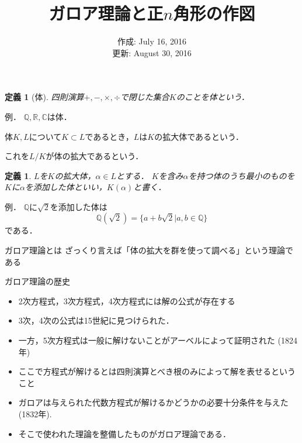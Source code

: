 \documentclass[dvipdfmx,17pt]{beamer}
\title{ガロア理論と正$n$角形の作図}
\date{作成: July 16, 2016 \\ 更新: August 30, 2016 }
\theoremstyle{plain}
\newtheorem{defi}[thm]{定義}
\newcommand{\Q}{\mathbb{Q}}
\newcommand{\R}{\mathbb{R}}
\newcommand{\C}{\mathbb{C}}
\begin{document}
\begin{frame}\frametitle{}
\titlepage
\end{frame}

\begin{frame}
\begin{defi}[体]
四則演算$+, -, \times, \div$で閉じた集合$K$のことを体という．
\end{defi}
\end{frame}

\begin{frame}
例． $\Q, \R, \C$は体．
\end{frame}

\begin{frame}
体$K, L$について$K \subset L$であるとき，$L$は$K$の拡大体であるという．

これを$L/K$が体の拡大であるという．
\end{frame}

\begin{frame}
\begin{defi}
$L$を$K$の拡大体，$\alpha \in L$とする．
$K$を含み$\alpha$を持つ体のうち最小のものを$K$に$\alpha$を添加した体といい，$K(\alpha)$と書く．
\end{defi}
\end{frame}

\begin{frame}
例． $\Q$に$\sqrt{2}$を添加した体は
\[\Q(\sqrt{2}) = \{a+b\sqrt{2} | a, b \in \Q \} \]
である．
\end{frame}

\begin{frame}{ガロア理論とは}
ざっくり言えば「体の拡大を群を使って調べる」という理論である
\end{frame}

\begin{frame}{ガロア理論の歴史}
\begin{itemize}
\item 2次方程式，3次方程式，4次方程式には解の公式が存在する
\item 3次，4次の公式は15世紀に見つけられた．
\item 一方，5次方程式は一般に解けないことがアーベルによって証明された (1824年)
\item ここで方程式が解けるとは四則演算とべき根のみによって解を表せるということ
\end{itemize}
\end{frame}

\begin{frame}
\begin{itemize}
\item ガロアは与えられた代数方程式が解けるかどうかの必要十分条件を与えた (1832年).
\item そこで使われた理論を整備したものがガロア理論である．
\end{itemize}
\end{frame}
\end{document}
